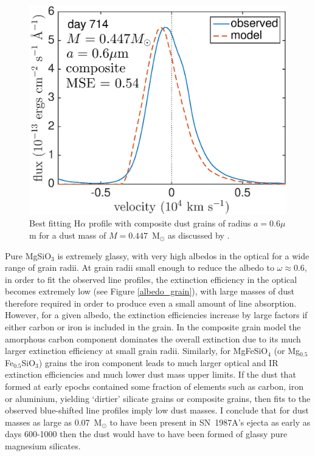 \begin{figure}
\centering
\includegraphics[clip=true,scale=0.5,trim= 0 0 0 0]{chapters/chapter5/images/silicates_take2/Ha_composite_dwek_bf.eps}
\caption{Best fitting H$\alpha$ profile with composite dust grains of radius $a=0.6\mu$m for a dust mass of $M=0.447$~M$_{\odot}$ as discussed by \citet{Dwek2015}.}
\label{ha_dwek_bf}
\end{figure}

Pure MgSiO$_3$ is extremely glassy, with very high albedos in the optical 
for a wide range of grain radii.  At grain radii small enough to reduce 
the albedo to $\omega \approx 0.6$, in order to fit the observed line 
profiles, the extinction efficiency in the optical becomes extremely low 
(see Figure \ref{albedo_grain}), with large masses of dust therefore 
required in order to produce even a small amount of line absorption. 
However, for a given albedo, the extinction efficiencies increase by large 
factors if either carbon or iron is included in the grain. In the 
composite grain model the amorphous carbon component dominates the overall 
extinction due to its much larger extinction efficiency at small grain 
radii. Similarly, for MgFeSiO$_4$ (or Mg$_{0.5}$Fe$_{0.5}$SiO$_3$) grains
the iron component leads to much larger optical and IR extinction
efficiencies and much lower dust mass upper limits.
If the dust that formed at early epochs contained some fraction of 
elements such as carbon, iron or aluminium, yielding `dirtier' silicate 
grains or composite grains, then fits to the observed blue-shifted line 
profiles imply low dust masses. I conclude that for dust masses as large
as 0.07~M$_\odot$ to have been present in SN~1987A's ejecta as early as 
days 600-1000 then the dust would have to have been formed of glassy pure 
magnesium silicates.

